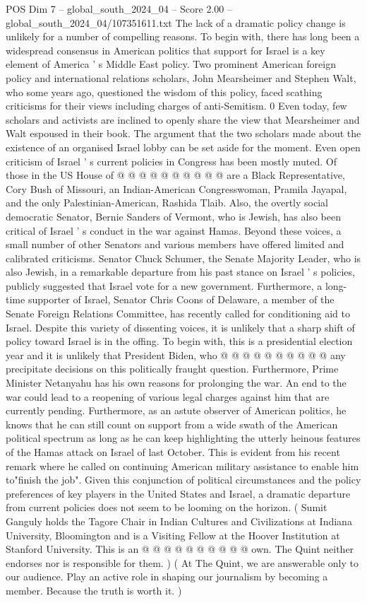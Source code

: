\begin{textsample}{POS Dim 7 – global\_south\_2024\_04 – Score 2.00 – global\_south\_2024\_04/107351611.txt}
The lack of a dramatic policy change is unlikely for a number of compelling reasons.
To begin with, there has long been a widespread consensus in American politics that support for Israel is a key element of America ' s Middle East policy.
Two prominent American foreign policy and international relations scholars, John Mearsheimer and Stephen Walt, who some years ago, questioned the wisdom of this policy, faced scathing criticisms for their views including charges of anti-Semitism. 0 Even today, few scholars and activists are inclined to openly share the view that Mearsheimer and Walt espoused in their book.
The argument that the two scholars made about the existence of an organised Israel lobby can be set aside for the moment.
Even open criticism of Israel ' s current policies in Congress has been mostly muted.
Of those in the US House of @ @ @ @ @ @ @ @ @ @ are a Black Representative, Cory Bush of Missouri, an Indian-American Congresswoman, Pramila Jayapal, and the only Palestinian-American, Rashida Tlaib.
Also, the overtly social democratic Senator, Bernie Sanders of Vermont, who is Jewish, has also been critical of Israel ' s conduct in the war against Hamas.
Beyond these voices, a small number of other Senators and various members have offered limited and calibrated criticisms.
Senator Chuck Schumer, the Senate Majority Leader, who is also Jewish, in a remarkable departure from his past stance on Israel ' s policies, publicly suggested that Israel vote for a new government.
Furthermore, a long-time supporter of Israel, Senator Chris Coons of Delaware, a member of the Senate Foreign Relations Committee, has recently called for conditioning aid to Israel.
Despite this variety of dissenting voices, it is unlikely that a sharp shift of policy toward Israel is in the offing.
To begin with, this is a presidential election year and it is unlikely that President Biden, who @ @ @ @ @ @ @ @ @ @ any precipitate decisions on this politically fraught question.
Furthermore, Prime Minister Netanyahu has his own reasons for prolonging the war.
An end to the war could lead to a reopening of various legal charges against him that are currently pending.
Furthermore, as an astute observer of American politics, he knows that he can still count on support from a wide swath of the American political spectrum as long as he can keep highlighting the utterly heinous features of the Hamas attack on Israel of last October.
This is evident from his recent remark where he called on continuing American military assistance to enable him to"finish the job".
Given this conjunction of political circumstances and the policy preferences of key players in the United States and Israel, a dramatic departure from current policies does not seem to be looming on the horizon. ( Sumit Ganguly holds the Tagore Chair in Indian Cultures and Civilizations at Indiana University, Bloomington and is a Visiting Fellow at the Hoover Institution at Stanford University.
This is an @ @ @ @ @ @ @ @ @ @ own.
The Quint neither endorses nor is responsible for them. ) ( At The Quint, we are answerable only to our audience.
Play an active role in shaping our journalism by becoming a member.
Because the truth is worth it. )


\end{textsample}

